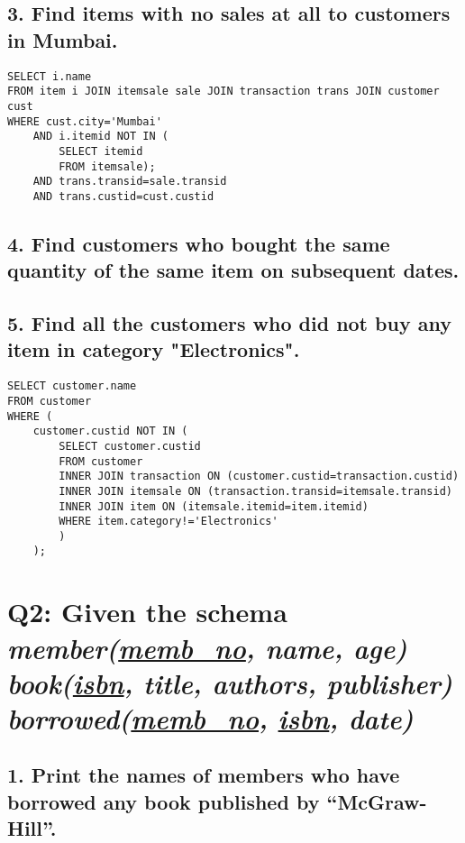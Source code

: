 \documentclass[12pt]{article}
\newcommand\tab[1][1cm]{\hspace*{#1}}
\begin{document}
\subsection*{3. Find items with no sales at all to customers in Mumbai.}
%


\begin{lstlisting}
SELECT i.name
FROM item i JOIN itemsale sale JOIN transaction trans JOIN customer cust
WHERE cust.city='Mumbai'
	AND i.itemid NOT IN (
		SELECT itemid 
		FROM itemsale);
	AND trans.transid=sale.transid 
	AND trans.custid=cust.custid
\end{lstlisting}

\subsection*{4. Find customers who bought the same quantity of the same item on subsequent dates.}
%

\subsection*{5. Find all the customers who did not buy any item in category "Electronics".}
%

\begin{lstlisting}
SELECT customer.name
FROM customer
WHERE (
	customer.custid NOT IN (
		SELECT customer.custid
		FROM customer
		INNER JOIN transaction ON (customer.custid=transaction.custid)
		INNER JOIN itemsale ON (transaction.transid=itemsale.transid)
		INNER JOIN item ON (itemsale.itemid=item.itemid)
		WHERE item.category!='Electronics'
		)
	);
\end{lstlisting}

\section*{Q2: Given the schema\\ 
\tab \textit{member(\underline{memb\_no}, name, age) \\
\tab book(\underline{isbn}, title, authors, publisher) \\ 
\tab borrowed(\underline{memb\_no}, \underline{isbn}, date)}}
%

\subsection*{1. Print the names of members who have borrowed any book published by “McGraw-Hill”. }
%
\end{document}
